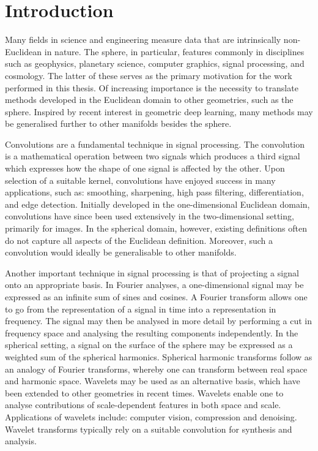 \chapter{Introduction}\label{sec:chapter1}

Many fields in science and engineering measure data that are intrinsically non-Euclidean in nature.
The sphere, in particular, features commonly in disciplines such as geophysics, planetary science, computer graphics, signal processing, and cosmology.
The latter of these serves as the primary motivation for the work performed in this thesis.
Of increasing importance is the necessity to translate methods developed in the Euclidean domain to other geometries, such as the sphere.
Inspired by recent interest in geometric deep learning, many methods may be generalised further to other manifolds besides the sphere.

Convolutions are a fundamental technique in signal processing.
The convolution is a mathematical operation between two signals which produces a third signal which expresses how the shape of one signal is affected by the other.
Upon selection of a suitable kernel, convolutions have enjoyed success in many applications, such as: smoothing, sharpening, high pass filtering, differentiation, and edge detection.
Initially developed in the one-dimensional Euclidean domain, convolutions have since been used extensively in the two-dimensional setting, primarily for images.
In the spherical domain, however, existing definitions often do not capture all aspects of the Euclidean definition.
Moreover, such a convolution would ideally be generalisable to other manifolds.

Another important technique in signal processing is that of projecting a signal onto an appropriate basis.
In Fourier analyses, a one-dimensional signal may be expressed as an infinite sum of sines and cosines.
A Fourier transform allows one to go from the representation of a signal in time into a representation in frequency.
The signal may then be analysed in more detail by performing a cut in frequency space and analysing the resulting components independently.
In the spherical setting, a signal on the surface of the sphere may be expressed as a weighted sum of the spherical harmonics.
Spherical harmonic transforms follow as an analogy of Fourier transforms, whereby one can transform between real space and harmonic space.
Wavelets may be used as an alternative basis, which have been extended to other geometries in recent times.
Wavelets enable one to analyse contributions of scale-dependent features in both space and scale.
Applications of wavelets include: computer vision, compression and denoising.
Wavelet transforms typically rely on a suitable convolution for synthesis and analysis.

